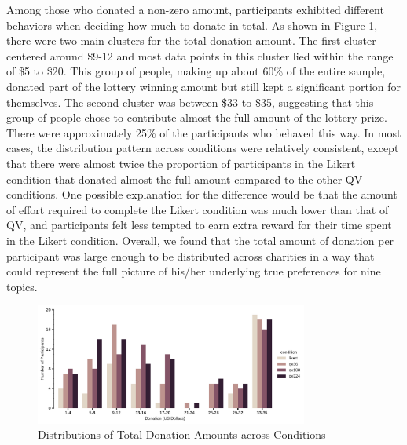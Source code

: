 Among those who donated a non-zero amount, participants exhibited different behaviors when deciding how much to donate in total. As shown in Figure \ref{fig:total_don_exp1}, there were two main clusters for the total donation amount. The first cluster centered around \$9-12 and most data points in this cluster lied within the range of \$5 to \$20. This group of people, making up about 60\% of the entire sample, donated part of the lottery winning amount but still kept a significant portion for themselves. The second cluster was between \$33 to \$35, suggesting that this group of people chose to contribute almost the full amount of the lottery prize. There were approximately 25\% of the participants who behaved this way. In most cases, the distribution pattern across conditions were relatively consistent, except that there were almost twice the proportion of participants in the Likert condition that donated almost the full amount compared to the other QV conditions. One possible explanation for the difference would be that the amount of effort required to complete the Likert condition was much lower than that of QV, and participants felt less tempted to earn extra reward for their time spent in the Likert condition. Overall, we found that the total amount of donation per participant was large enough to be distributed across charities in a way that could represent the full picture of his/her underlying true preferences for nine topics.

\begin{figure}[htpb]
    \centering
    \includegraphics[width=0.8\textwidth, keepaspectratio=true]{content/image/total_contributions_across_conditions.pdf}
    \caption{
       Distributions of Total Donation Amounts across Conditions
    }
    \label{fig:total_don_exp1}
\end{figure}

